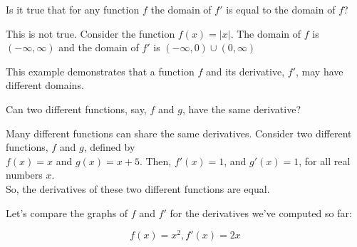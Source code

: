 \documentclass{ximera}
\begin{document}
\begin{question}
	Is it true that for any function $f$ the domain of $f'$ is equal to the domain of $f$?
	\begin{prompt}
		\begin{multipleChoice}
		\end{multipleChoice}
		\begin{feedback}
			This is not true. 
			Consider the function $f(x)=|x|$. 
			The domain of $f$ is $(-\infty, \infty)$ and the domain of $f'$ is $(-\infty,0)\cup(0,\infty)$
				
			This example demonstrates that a function $f$ and its derivative, $f'$, may have different domains.
		  \end{feedback}
	\end{prompt}
\end{question}


\begin{question}
	Can two different functions, say, $f$ and $g$, have the same derivative?
	\begin{prompt}
		\begin{multipleChoice}
			\choice[correct]{yes}
			\choice{no}
		\end{multipleChoice}
		  \begin{feedback}
		    Many different functions can share the same derivatives.
		    Consider two different functions, $f$ and $g$, defined by\\
		    $f(x)=x$ and $g(x)=x+5$.
		    Then, $f'(x)=1$, and $g'(x)=1$, for all real numbers $x$.\\
		    So,  the derivatives of these two different functions are equal.
		
		  \end{feedback}
	\end{prompt}
\end{question}


Let's compare the graphs of $f$ and $f'$ for the derivatives we've computed so far:

\[f(x)=x^2, f'(x)=2x\]
\begin{image}
  \end{image}
\end{document}
